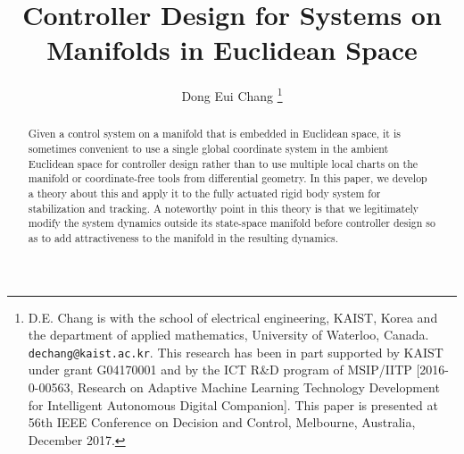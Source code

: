 \documentclass[letterpaper, 10 pt, conference]{ieeeconf}  %
\title{\LARGE \bf
Controller Design for Systems on Manifolds in Euclidean Space
}
\author{Dong Eui Chang%
\thanks{D.E. Chang is with the school of electrical engineering, KAIST, Korea and the department of applied mathematics, University of Waterloo, Canada.
        {\tt\small dechang@kaist.ac.kr}. This research has been in part supported by KAIST  under grant G04170001 and  by the ICT R\&D program of MSIP/IITP [2016-0-00563, Research on Adaptive Machine Learning Technology Development for Intelligent Autonomous Digital Companion]. This paper is presented at 56th IEEE Conference on Decision and Control, Melbourne, Australia, December 2017.}
}
\begin{document}
\maketitle
\thispagestyle{empty}
\pagestyle{empty}


\begin{abstract}
Given a control system on a manifold that is embedded in Euclidean space, it is sometimes convenient to use a single global coordinate system in the ambient Euclidean space for controller design  rather than to use multiple local charts on the manifold or  coordinate-free tools from differential geometry. In this paper, we develop a theory about this and apply it to the fully actuated rigid body system for stabilization and tracking. A noteworthy  point in this theory is that   we legitimately modify the system dynamics outside its state-space manifold before controller design so as to add  attractiveness  to the manifold in the resulting  dynamics.


\end{abstract}


\end{document}
